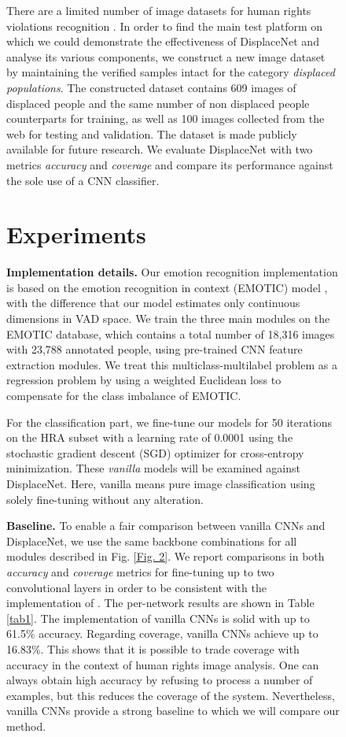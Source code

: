 \documentclass[10pt,twocolumn,letterpaper]{article}
\begin{document}
\begin{figure}[t!]
There are a limited number of image datasets for human rights violations recognition \cite{kalliatakis2019exploring, visapp17}. In order to find the main test platform on which we could demonstrate the effectiveness of DisplaceNet and analyse its various components, we construct a new image dataset by maintaining the verified samples intact for the category \textit{displaced populations}. The constructed dataset contains 609 images of displaced people and the same number of non displaced people counterparts for training, as well as 100 images collected from the web for testing and validation. The dataset is made publicly available for future research.
We evaluate DisplaceNet with two metrics \textit{accuracy} and \textit{coverage} and compare its performance against the sole use of a CNN classifier.


\section{Experiments}

\noindent
\textbf{Implementation details.} Our emotion recognition implementation is based on the emotion recognition in context (EMOTIC) model \cite{kosti2017emotion}, with the difference that our model estimates only continuous dimensions in VAD space. We train the three main modules on the EMOTIC database, which contains a total number of 18,316 images with 23,788 annotated people, using pre-trained CNN feature extraction modules. We treat this multiclass-multilabel problem as a regression problem by using a weighted Euclidean loss to compensate for the class imbalance of EMOTIC. 

For the classification part, we fine-tune our models for 50 iterations on the HRA subset with a learning rate of 0.0001 using the stochastic gradient descent (SGD) \cite{lecun1989backpropagation} optimizer for cross-entropy minimization. These \textit{vanilla} models will be examined against DisplaceNet. Here, vanilla means pure image classification using solely fine-tuning without any alteration. 



\noindent
\textbf{Baseline.} To enable a fair comparison between vanilla CNNs and DisplaceNet, we use the same backbone combinations for all modules described in Fig. \ref{Fig. 2}. We report comparisons in both \textit{accuracy} and \textit{coverage} metrics for fine-tuning up to two convolutional layers in order to be consistent with the implementation of \cite{kalliatakis2019exploring}. The per-network results are shown in Table \ref{tab1}. The implementation of vanilla CNNs is solid with up to 61.5\% accuracy. 
Regarding coverage, vanilla CNNs achieve up to 16.83\%. This shows that it is possible to trade coverage with accuracy in the context of human rights image analysis. One can always obtain high accuracy by refusing to process a number of examples, but this reduces the coverage of the system. Nevertheless, vanilla CNNs provide a strong baseline to which we will compare our method.


\end{figure}
\end{document}
